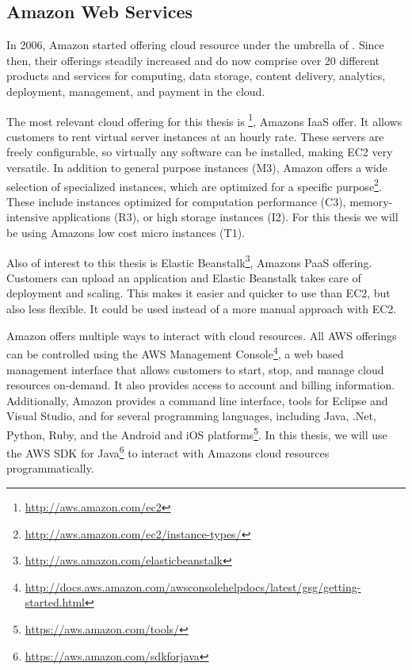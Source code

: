 \subsection{Amazon Web Services}

In 2006, Amazon started offering cloud resource under the umbrella of .
Since then, their offerings steadily increased and do now comprise over 20 different products and services for computing, data storage, content delivery, analytics, deployment, management, and payment in the cloud.

The most relevant cloud offering for this thesis is \footnote{\url{http://aws.amazon.com/ec2}}, Amazons IaaS offer.
It allows customers to rent virtual server instances at an hourly rate.
These servers are freely configurable, so virtually any software can be installed, making EC2 very versatile.
In addition to general purpose instances (M3), Amazon offers a wide selection of specialized instances, which are optimized for a specific purpose\footnote{\url{http://aws.amazon.com/ec2/instance-types/}}.
These include instances optimized for computation performance (C3), memory-intensive applications (R3), or high storage instances (I2).
For this thesis we will be using Amazons low cost micro instances (T1).

Also of interest to this thesis is Elastic Beanstalk\footnote{\url{http://aws.amazon.com/elasticbeanstalk}}, Amazons PaaS offering.
Customers can upload an application and Elastic Beanstalk takes care of deployment and scaling.
This makes it easier and quicker to use than EC2, but also less flexible.
It could be used instead of a more manual approach with EC2.

Amazon offers multiple ways to interact with cloud resources.
All AWS offerings can be controlled using the AWS Management Console\footnote{\url{http://docs.aws.amazon.com/awsconsolehelpdocs/latest/gsg/getting-started.html}}, a web based management interface that allows customers to start, stop, and manage cloud resources on-demand.
It also provides access to account and billing information.
Additionally, Amazon provides a command line interface, tools for Eclipse and Visual Studio, and  for several programming languages, including Java, .Net, Python, Ruby, and the Android and iOS platforms\footnote{\url{https://aws.amazon.com/tools/}}.
In this thesis, we will use the AWS SDK for Java\footnote{\url{https://aws.amazon.com/sdkforjava}} to interact with Amazons cloud resources programmatically.
